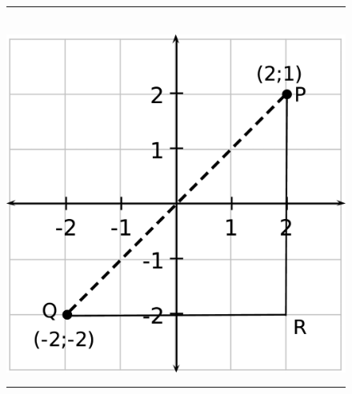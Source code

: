 	\begin{figure}[H] %
    \begin{center}
    \rule[.1in]{\figurerulewidth}{.005in} \\
        \label{m39107*uid38!!!underscore!!!media}\label{m39107*uid38!!!underscore!!!printimage}\includegraphics{col11306.imgs/m39107_MG10C14_015.png} %
        
      \vspace{2pt}
    \vspace{.1in}
    \rule[.1in]{\figurerulewidth}{.005in} \\
        
    \end{center}

 \end{figure}   

    \addtocounter{footnote}{-0}
    
